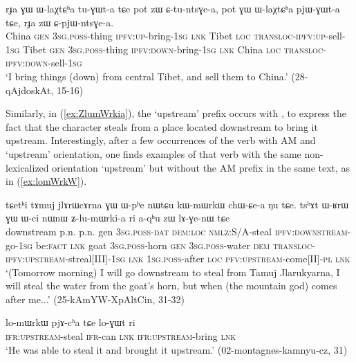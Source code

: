 \begin{exe}
\ex \label{ex:CpjWntGea}
\gll rɟa ɣɯ ɯ-laχtɕʰa tu-ɣɯt-a tɕe pot zɯ ɕ-tu-ntsɣe-a, pot ɣɯ ɯ-laχtɕʰa pjɯ-ɣɯt-a tɕe, rɟa zɯ ɕ-pjɯ-ntsɣe-a. \\
China \textsc{gen} \textsc{3sg}.\textsc{poss}-thing  \textsc{ipfv}:\textsc{up}-bring-\textsc{1sg} \textsc{lnk} Tibet \textsc{loc} \textsc{transloc}-\textsc{ipfv}:\textsc{up}-sell-\textsc{1sg}  Tibet \textsc{gen} \textsc{3sg}.\textsc{poss}-thing  \textsc{ipfv}:\textsc{down}-bring-\textsc{1sg} \textsc{lnk} China \textsc{loc} \textsc{transloc}-\textsc{ipfv}:\textsc{down}-sell-\textsc{1sg} \\
\glt `I bring things (down) from central Tibet, and sell them to China.' (28-qAjdoskAt, 15-16)
\end{exe}
 
Similarly, in  (\ref{ex:ZlumWrkia}), the `upstream' prefix occurs with , to express the fact that the character steals from a place located downstream to bring it upstream. Interestingly, after a few occurrences of the verb  with AM and `upstream' orientation, one finds examples of that verb with the same non-lexicalized orientation `upstream' but without the AM prefix in the same text, as in (\ref{ex:lomWrkW}).

\begin{exe}
\ex \label{ex:ZlumWrkia}
 \gll tɕetʰi tɤmuj jlɤrɯcɤrna ɣɯ ɯ-pʰe nɯtɕu kɯ-mɯrkɯ chɯ-ɕe-a ŋu tɕe. tsʰɤt ɯ-ʁrɯ ɣɯ ɯ-ci nɯnɯ ʑ-lu-mɯrki-a ri a-qʰu zɯ lɤ-ɣe-nɯ tɕe \\
 downstream p.n. p.n. gen \textsc{3sg}.\textsc{poss}-\textsc{dat} \textsc{dem}:\textsc{loc}  \textsc{nmlz}:S/A-steal  \textsc{ipfv}:\textsc{downstream}-go-\textsc{1sg} be:\textsc{fact} \textsc{lnk}  goat \textsc{3sg}.\textsc{poss}-horn \textsc{gen} \textsc{3sg}.\textsc{poss}-water \textsc{dem} \textsc{transloc}-\textsc{ipfv}:\textsc{upstream}-streal[III]-\textsc{1sg} \textsc{lnk} \textsc{1sg}.\textsc{poss}-after \textsc{loc} \textsc{pfv}:\textsc{upstream}-come[II]-\textsc{pl} \textsc{lnk}  \\
 \glt `(Tomorrow  morning) I will go downstream to steal from Tamuj Jlarukyarna, I will steal the water from the goat's horn, but when (the mountain god) comes after me...' (25-kAmYW-XpAltCin, 31-32)
\end{exe}

\begin{exe}
\ex \label{ex:lomWrkW}
 \gll lo-mɯrkɯ pjɤ-cʰa tɕe lo-ɣɯt ri \\
 \textsc{ifr}:\textsc{upstream}-steal \textsc{ifr}-can \textsc{lnk} \textsc{ifr}:\textsc{upstream}-bring \textsc{lnk} \\
\glt `He was able to steal it and brought it upstream.' (02-montagnes-kamnyu-cz, 31)
\end{exe}

